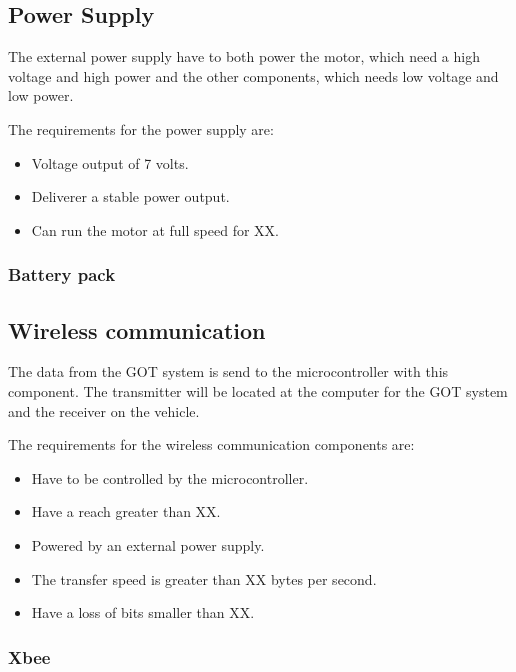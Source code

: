 
\subsection{Power Supply}
The external power supply have to both power the motor, which need a high voltage and high power and the other components, which needs low voltage and low power.

The requirements for the power supply are:
\begin{itemize}
\item Voltage output of 7 volts. 
\item Deliverer a stable power output.
\item Can run the motor at full speed for XX. 
\end{itemize}

\subsubsection{Battery pack}


\subsection{Wireless communication}
The data from the GOT system is send to the microcontroller with this component. The transmitter will be located at the computer for the GOT system and the receiver on the vehicle.

The requirements for the wireless communication components are:
\begin{itemize}
\item Have to be controlled by the microcontroller.
\item Have a reach greater than XX. 
\item Powered by an external power supply.
\item The transfer speed is greater than XX bytes per second. 
\item Have a loss of bits smaller than XX. 
\end{itemize}

\subsubsection{Xbee}

